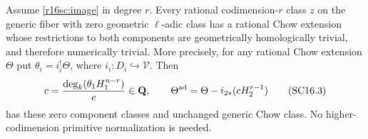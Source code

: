 \begin{theorem}
\label{r16sc:correction}
Assume \eqref{r16sc:image} in degree $r$. Every rational
codimension-$r$ class $z$ on the generic fiber with zero geometric
$\ell$-adic class has a rational Chow extension whose restrictions
to both components are geometrically homologically trivial,
and therefore numerically trivial. More precisely, for any
rational Chow extension $\Theta$ put $\theta_i=i_i^!\Theta$,
where $i_i:D_i\hookrightarrow\mathcal V$. Then
\[
 c=\frac{\deg_k(\theta_1 H_1^{n-r})}{e}\in\mathbf Q,
 \qquad
       \Theta^{\rm ad}=\Theta-i_{2*}(cH_2^{r-1})
 \tag{SC16.3}\label{r16sc:explicit-correction}
\]
has these zero component classes and unchanged generic Chow class.
No higher-codimension primitive normalization is needed.
\end{theorem}

